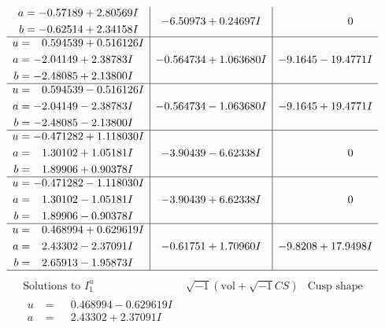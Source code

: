 \documentclass[1p]{elsarticle_modified}
\theoremstyle{definition}
\newcommand{\I}{\sqrt{-1}}
\begin{document}
$$\begin{array}{c|c|c}
\begin{aligned}
a &= -0.57189 + 2.80569 I \\
b &= -0.62514 + 2.34158 I\end{aligned}
 & -6.50973 + 0.24697 I & \phantom{-0.000000 } 0 \\ \hline\begin{aligned}
u &= \phantom{-}0.594539 + 0.516126 I \\
a &= -2.04149 + 2.38783 I \\
b &= -2.48085 + 2.13800 I\end{aligned}
 & -0.564734 + 1.063680 I & -9.1645 - 19.4771 I \\ \hline\begin{aligned}
u &= \phantom{-}0.594539 - 0.516126 I \\
a &= -2.04149 - 2.38783 I \\
b &= -2.48085 - 2.13800 I\end{aligned}
 & -0.564734 - 1.063680 I & -9.1645 + 19.4771 I \\ \hline\begin{aligned}
u &= -0.471282 + 1.118030 I \\
a &= \phantom{-}1.30102 + 1.05181 I \\
b &= \phantom{-}1.89906 + 0.90378 I\end{aligned}
 & -3.90439 - 6.62338 I & \phantom{-0.000000 } 0 \\ \hline\begin{aligned}
u &= -0.471282 - 1.118030 I \\
a &= \phantom{-}1.30102 - 1.05181 I \\
b &= \phantom{-}1.89906 - 0.90378 I\end{aligned}
 & -3.90439 + 6.62338 I & \phantom{-0.000000 } 0 \\ \hline\begin{aligned}
u &= \phantom{-}0.468994 + 0.629619 I \\
a &= \phantom{-}2.43302 - 2.37091 I \\
b &= \phantom{-}2.65913 - 1.95873 I\end{aligned}
 & -0.61751 + 1.70960 I & -9.8208 + 17.9498 I\\
 \hline 
 \end{array}$$\newpage$$\begin{array}{c|c|c}  
\text{Solutions to }I^u_{1}& \I (\text{vol} + \sqrt{-1}CS) & \text{Cusp shape}\\
 \hline 
\begin{aligned}
u &= \phantom{-}0.468994 - 0.629619 I \\
a &= \phantom{-}2.43302 + 2.37091 I \\

\end{aligned}
\end{array}$$
\end{document}
